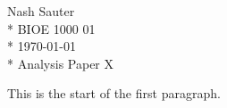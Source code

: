 \documentclass[12pt]{article}
\begin{document}
\noindent Nash Sauter \\*
BIOE 1000 01 \\*
\today \\*
Analysis Paper X

This is the start of the first paragraph.
\end{document}
